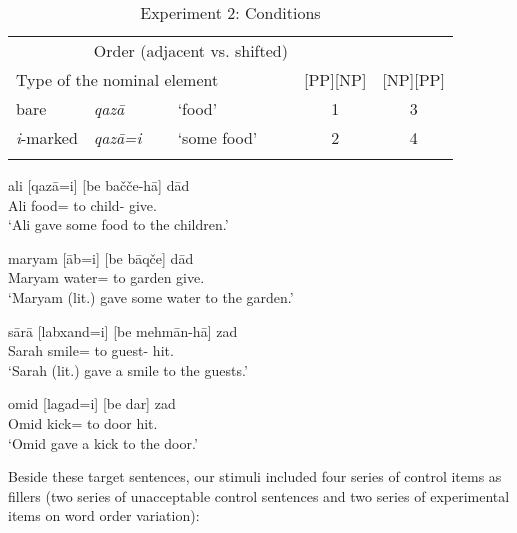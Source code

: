 \documentclass[output=paper]{langsci/langscibook}
\begin{document}
\begin{table}
	\begin{tabular}{lllcc}
              \lsptoprule 
		\multicolumn{3}{l}{} & \multicolumn{2}{c}{Order (adjacent vs. shifted)}\\\cmidrule(lr){4-5} 
		\multicolumn{3}{l}{Type of the nominal element} & [PP][NP] & [NP][PP]\\ 
		\midrule 
		bare & \textit{qaz\=a} & `food' & 1 & 3\\ 
		\textit{i}-marked &  \textit{qaz\=a=i} & `some food' & 2 & 4\\ 
		\lspbottomrule
	\end{tabular}
	\caption{Experiment 2: Conditions}\label{Tab:Exp2-Design}
\end{table}

\begin{exe}
	\ex\label{qaza-exp2}
	\gll ali [qaz\=a=i] [be ba\v{c}\v{c}e-h\=a]    d\=ad\\
	Ali food= to child-  give.\\
	\glt	`Ali gave some food to the children.'
	
	\ex\label{ab-exp2}
	\gll maryam   [\=ab=i] [be b\=aq\v{c}e] d\=ad\\
	Maryam  water= to garden give.\\
	\glt	`Maryam (lit.) gave some water to the garden.'

	\ex\label{slm-exp2}
	\gll s\=ar\=a  [labxand=i] [be mehm\=an-h\=a]  zad\\
	Sarah smile= to guest-  hit.\\
	\glt	`Sarah (lit.) gave a smile to the guests.'

	\ex\label{lgd-exp2}
	\gll omid [lagad=i] [be dar] zad\\
	Omid  kick= to door hit.\\
	\glt	`Omid  gave a kick to the door.'
\end{exe}

Beside these target sentences, our stimuli included four series of control items as fillers (two series of unacceptable control sentences and two series of experimental items on word order variation):
\end{document}
